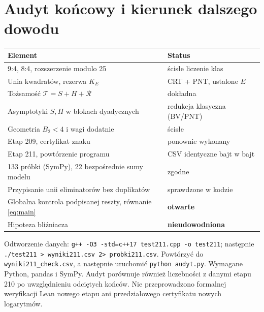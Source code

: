 \documentclass[11pt,a4paper]{article}
\newcommand{\R}{\mathcal R}
\newcommand{\T}{\mathcal T}
\begin{document}
\section{Audyt końcowy i kierunek dalszego dowodu}
\begin{center}\small\begin{tabular}{p{.58\linewidth}p{.33\linewidth}}\toprule
Element & Status\\\midrule
9:4, 8:4, rozszerzenie modulo 25 & ścisłe liczenie klas\\
Unia kwadratów, rezerwa $K_E$ & CRT + PNT, ustalone $E$\\
Tożsamość $\T=S+H+\R$ & dokładna\\
Asymptotyki $S,H$ w blokach dyadycznych & redukcja klasyczna (BV/PNT)\\
Geometria $B_2<4$ i wagi dodatnie & ścisłe\\
Etap 209, certyfikat znaku & ponownie wykonany\\
Etap 211, powtórzenie programu & CSV identyczne bajt w bajt\\
133 próbki (SymPy), 22 bezpośrednie sumy modelu & zgodne\\
Przypisanie unii eliminatorów bez duplikatów & sprawdzone w kodzie\\
Globalna kontrola podpisanej reszty, równanie \eqref{eq:main} & \textbf{otwarte}\\
Hipoteza bliźniacza & \textbf{nieudowodniona}\\\bottomrule\end{tabular}\end{center}
Odtworzenie danych: \texttt{g++ -O3 -std=c++17 test211.cpp -o test211}; następnie \texttt{./test211 > wyniki211.csv 2> probki211.csv}. Powtórzyć do \texttt{wyniki211\_check.csv}, a następnie uruchomić \texttt{python audyt.py}. Wymagane Python, pandas i SymPy. Audyt porównuje również liczebności z danymi etapu 210 po uwzględnieniu odciętych końców. Nie przeprowadzono formalnej weryfikacji Lean nowego etapu ani przedziałowego certyfikatu nowych logarytmów.
\end{document}
